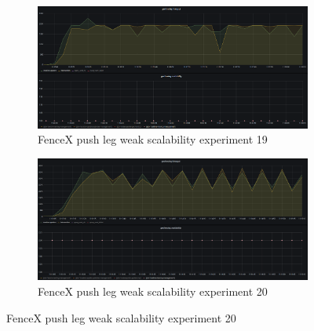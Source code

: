 \documentclass[a4]{report}
\begin{document}
    \begin{figure}
        \centering
        \begin{subfigure}[b]{\textwidth}
            \centering
            \caption{FenceX push leg weak scalability experiment 19}
            \label{fig:ex19}
            \includegraphics[width=\textwidth, height=0.35\textheight, scale=2]{images/evaluation/ex19-benchmarking-ongoing-1per16sec.png}
        \end{subfigure}

        \begin{subfigure}[b]{\textwidth}
            \centering
            \caption{FenceX push leg weak scalability experiment 20}
            \label{fig:ex20}
            \includegraphics[width=\textwidth, height=0.35\textheight, scale=2]{images/evaluation/ex20-benchmarking-ongoing-1per10sec.png}
        \end{subfigure}
    \end{figure}
\end{document}
